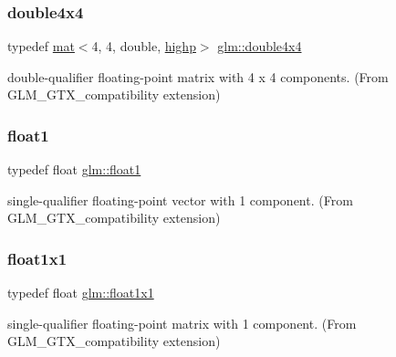 \subsubsection{\texorpdfstring{double4x4}{double4x4}}
{\footnotesize\ttfamily typedef \mbox{\hyperlink{structglm_1_1mat}{mat}}$<$4, 4, double, \mbox{\hyperlink{namespaceglm_a36ed105b07c7746804d7fdc7cc90ff25ac6f7eab42eacbb10d59a58e95e362074}{highp}}$>$ \mbox{\hyperlink{group__gtx__compatibility_gaa0d75f4adb5cb1af3b1ba09720954306}{glm\+::double4x4}}}



double-\/qualifier floating-\/point matrix with 4 x 4 components. (From G\+L\+M\+\_\+\+G\+T\+X\+\_\+compatibility extension) 

\mbox{\label{group__gtx__compatibility_gae0ad1b0450320cda98bbbecb56bc3167}} 
\subsubsection{\texorpdfstring{float1}{float1}}
{\footnotesize\ttfamily typedef float \mbox{\hyperlink{group__gtx__compatibility_gae0ad1b0450320cda98bbbecb56bc3167}{glm\+::float1}}}



single-\/qualifier floating-\/point vector with 1 component. (From G\+L\+M\+\_\+\+G\+T\+X\+\_\+compatibility extension) 

\mbox{\label{group__gtx__compatibility_gaac1faa940ac1fbb32d4a315005b578af}} 
\subsubsection{\texorpdfstring{float1x1}{float1x1}}
{\footnotesize\ttfamily typedef float \mbox{\hyperlink{group__gtx__compatibility_gaac1faa940ac1fbb32d4a315005b578af}{glm\+::float1x1}}}



single-\/qualifier floating-\/point matrix with 1 component. (From G\+L\+M\+\_\+\+G\+T\+X\+\_\+compatibility extension) 

